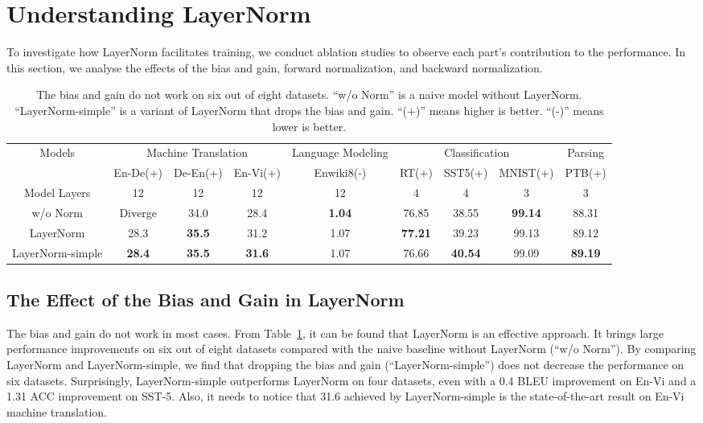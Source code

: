 \documentclass{article}
\begin{document}
  
\section{Understanding LayerNorm}
To investigate how LayerNorm facilitates training, we conduct ablation studies to
observe each part's contribution to the performance. In this section, we analyse the effects of the bias and gain, forward normalization, and backward normalization.


\begin{table}[h]
\small
\setlength{\tabcolsep}{2.5pt}
\centering
\caption{ The bias and gain do not work on six out of eight datasets.  ``w/o Norm'' is a naive model without LayerNorm. ``LayerNorm-simple'' is a variant of LayerNorm that drops the bias and gain. ``(+)'' means higher is better. ``(-)'' means lower is better. }
  \scalebox{0.95}
    {
 \begin{tabular}{c|ccc|c|ccc|c}
  \toprule  \multirow{2}{*}{Models}&\multicolumn{3}{c|}{Machine Translation} &\multicolumn{1}{c|}{Language Modeling} &\multicolumn{3}{c|}{ Classification}  & Parsing  \\
  \cmidrule{2-9}
 & En-De(+) & De-En(+) & En-Vi(+) & Enwiki8(-) & RT(+)  & SST5(+) &  MNIST(+) & PTB(+) \\
    \midrule   Model Layers  & 12 & 12 & 12 & 12 & 4 & 4 & 3 & 3\\
   \midrule   w/o Norm  &Diverge & 34.0 & 28.4 & \textbf{1.04} & 76.85 & 38.55 & \textbf{99.14} &88.31\\ 
  LayerNorm  & 28.3 & \textbf{35.5} &  31.2& 1.07 & \textbf{77.21} & 39.23   & 99.13 & 89.12\\
  


  LayerNorm-simple  & \textbf{28.4} & \textbf{35.5} & \textbf{31.6} &1.07 & 76.66 & 
  \textbf{40.54} & 99.09 & \textbf{89.19}\\



  \bottomrule \end{tabular}}
  
  \label{tab:bias}
  \end{table}


\subsection{The Effect of the Bias and Gain in LayerNorm }
The bias and gain do not work in most cases. From Table~\ref{tab:bias},
it can be found that LayerNorm is an effective approach. It brings large performance improvements on six out of eight datasets compared with the naive baseline without LayerNorm (``w/o Norm''). By comparing LayerNorm and LayerNorm-simple, we find that dropping the bias and gain (``LayerNorm-simple'') does not  decrease the performance on six datasets. Surprisingly, LayerNorm-simple  outperforms LayerNorm on four datasets, even with a 0.4 BLEU improvement on En-Vi and a 1.31 ACC improvement on SST-5. Also, it needs to notice that 31.6 achieved by LayerNorm-simple is the state-of-the-art result on En-Vi machine translation. 
\end{document}
